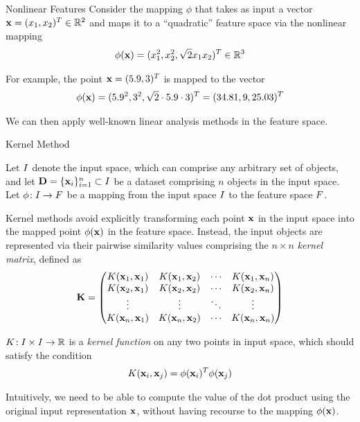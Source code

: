 \begin{frame}{Nonlinear Features}
Consider the mapping $\phi$ that
takes as input a vector $\mathbf{x}=(x_1,x_2)^T \in {\mathord{\mathbb R}}^2$ and maps it to a
``quadratic''  feature space via the nonlinear mapping
\begin{align*}
  \phi(\mathbf{x}) = (x_1^2, x_2^2, \sqrt{2} x_1x_2)^T \in {\mathord{\mathbb R}}^3
\end{align*}

\medskip
For example, the point $\mathbf{x} = (5.9,3)^T$ is mapped to the vector
\begin{align*}
  \phi(\mathbf{x}) = (5.9^2, 3^2, \sqrt{2}\cdot5.9\cdot3)^T = (34.81,9,25.03)^T
\end{align*}

\medskip
We can then apply well-known
linear analysis methods in the feature space. 
\end{frame}


\begin{frame}{Kernel Method}

  \small
Let ${\relax I}$ denote the input space, which can
comprise any arbitrary set of objects, and let $\mathbf{D} = \{\mathbf{x}_i\}_{i=1}^n
\subset {\relax I}$ be a dataset comprising $n$ objects in the input space.
Let $\phi\!: {\relax I} \to {\relax F}$ be a mapping from the
input space ${\relax I}$ to the feature space ${\relax F}$. 

\medskip
Kernel methods avoid explicitly transforming each point $\mathbf{x}$ in the
input space into the mapped point $\phi(\mathbf{x})$ in the feature space.
Instead, the input objects are represented via their
pairwise similarity values comprising 
the $n \times n$ {\em kernel matrix}, def\/{i}ned as
\begin{align*}
  \bK = \matr{
      K(\bx_1,\bx_1) & K(\bx_1,\bx_2) & \cdots & K(\bx_1,\bx_n)\\
      K(\bx_2,\bx_1) & K(\bx_2,\bx_2) & \cdots & K(\bx_2,\bx_n)\\
      \vdots & \vdots & \ddots & \vdots\\
      K(\bx_n,\bx_1) & K(\bx_n,\bx_2) & \cdots & K(\bx_n,\bx_n)\\
    }
\end{align*}

\medskip
$K\!: {\relax I} \times {\relax I} \to {\mathord{\mathbb R}}$
is a {\em kernel function} on any two points in input space, which 
should satisfy the
condition
\begin{align*}
K(\mathbf{x}_i, \mathbf{x}_{j})  = \phi(\mathbf{x}_i)^T \phi(\mathbf{x}_{j})
\end{align*}

\medskip
Intuitively, we need to
be able to compute the value of the dot product using the
original input representation $\mathbf{x}$, without having recourse to the
mapping $\phi(\mathbf{x})$.  
\end{frame}


